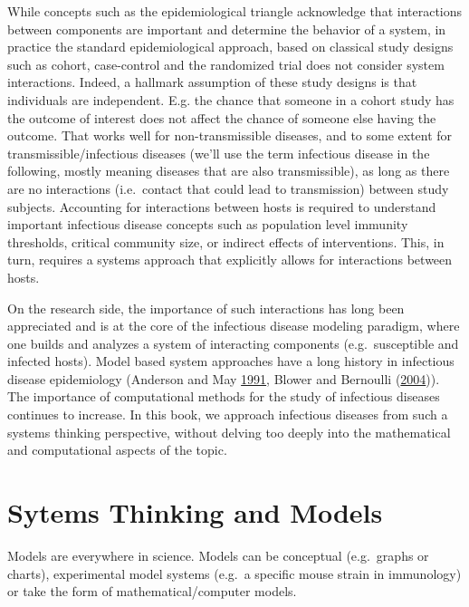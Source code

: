 \documentclass[]{book}
\theoremstyle{definition}
\theoremstyle{definition}
\theoremstyle{definition}
\theoremstyle{remark}
\begin{document}
While concepts such as the epidemiological triangle acknowledge that
interactions between components are important and determine the behavior
of a system, in practice the standard epidemiological approach, based on
classical study designs such as cohort, case-control and the randomized
trial does not consider system interactions. Indeed, a hallmark
assumption of these study designs is that individuals are independent.
E.g. the chance that someone in a cohort study has the outcome of
interest does not affect the chance of someone else having the outcome.
That works well for non-transmissible diseases, and to some extent for
transmissible/infectious diseases (we'll use the term infectious disease
in the following, mostly meaning diseases that are also transmissible),
as long as there are no interactions (i.e.~contact that could lead to
transmission) between study subjects. Accounting for interactions
between hosts is required to understand important infectious disease
concepts such as population level immunity thresholds, critical
community size, or indirect effects of interventions. This, in turn,
requires a systems approach that explicitly allows for interactions
between hosts.

On the research side, the importance of such interactions has long been
appreciated and is at the core of the infectious disease modeling
paradigm, where one builds and analyzes a system of interacting
components (e.g.~susceptible and infected hosts). Model based system
approaches have a long history in infectious disease epidemiology
(Anderson and May \protect\hyperlink{ref-anderson91}{1991}, Blower and
Bernoulli (\protect\hyperlink{ref-blower04}{2004})). The importance of
computational methods for the study of infectious diseases continues to
increase. In this book, we approach infectious diseases from such a
systems thinking perspective, without delving too deeply into the
mathematical and computational aspects of the topic.

\section{Sytems Thinking and Models}\label{sytems-thinking-and-models}

Models are everywhere in science. Models can be conceptual (e.g.~graphs
or charts), experimental model systems (e.g.~a specific mouse strain in
immunology) or take the form of mathematical/computer models.
\end{document}
